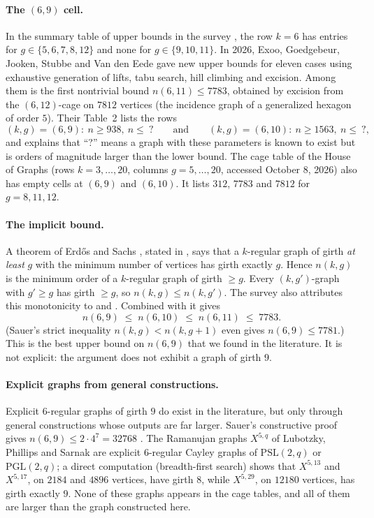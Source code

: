 \documentclass[11pt]{article}
\numberwithin{equation}{section}
\theoremstyle{definition}
\theoremstyle{remark}
\begin{document}
\paragraph{The $(6,9)$ cell.}
In the summary table of upper bounds in the survey \cite[Table~6]{ExJa}, the row $k=6$ has entries
for $g\in\{5,6,7,8,12\}$ and none for $g\in\{9,10,11\}$.
In 2026, Exoo, Goedgebeur, Jooken, Stubbe and Van den Eede \cite{EGJSV} gave new upper bounds for
eleven cases using exhaustive generation of lifts, tabu search, hill climbing and excision.
Among them is the first nontrivial bound $n(6,11)\le 7783$, obtained by excision from the
$(6,12)$-cage on $7812$ vertices (the incidence graph of a generalized hexagon of order $5$).
Their Table~2 lists the rows
\[
  (k,g)=(6,9):\ n\ge 938,\ n\le\ ?\qquad\text{and}\qquad (k,g)=(6,10):\ n\ge 1563,\ n\le\ ?,
\]
and explains that ``?'' means a graph with these parameters is known to exist but is orders of
magnitude larger than the lower bound. The cage table of the House of Graphs \cite{HoGcages}
(rows $k=3,\dots,20$, columns $g=5,\dots,20$, accessed October 8, 2026) also has empty cells
at $(6,9)$ and $(6,10)$. It lists $312$, $7783$ and $7812$ for $g=8,11,12$.

\paragraph{The implicit bound.}
A theorem of Erd\H{o}s and Sachs \cite{ES}, stated in \cite[Theorem~4]{ExJa}, says that a
$k$-regular graph of girth \emph{at least} $g$ with the minimum number of vertices has girth exactly
$g$. Hence $n(k,g)$ is the minimum order of a $k$-regular graph of girth $\ge g$. Every
$(k,g')$-graph with $g'\ge g$ has girth $\ge g$, so $n(k,g)\le n(k,g')$. The survey
\cite[p.~5]{ExJa} also attributes this monotonicity to \cite{HS} and \cite{FHR}.
Combined with \cite{EGJSV} it gives
\begin{equation}\label{eq:implicit}
  n(6,9)\;\le\; n(6,10)\;\le\; n(6,11)\;\le\; 7783 .
\end{equation}
(Sauer's strict inequality $n(k,g)<n(k,g+1)$ \cite[Theorem~9]{ExJa} even gives $n(6,9)\le 7781$.)
This is the best upper bound on $n(6,9)$ that we found in the literature. It is not explicit:
the argument does not exhibit a graph of girth $9$.

\paragraph{Explicit graphs from general constructions.}
Explicit $6$-regular graphs of girth $9$ do exist in the literature, but only through general
constructions whose outputs are far larger. Sauer's constructive proof gives
$n(6,9)\le 2\cdot 4^{7}=32768$ \cite[Theorem~7]{ExJa}. The Ramanujan graphs $X^{5,q}$ of
Lubotzky, Phillips and Sarnak \cite{LPS} are explicit $6$-regular Cayley graphs of
$\mathrm{PSL}(2,q)$ or $\mathrm{PGL}(2,q)$; a direct computation (breadth-first search) shows that
$X^{5,13}$ and $X^{5,17}$, on $2184$ and $4896$ vertices, have girth $8$, while $X^{5,29}$, on
$12180$ vertices, has girth exactly $9$. None of these graphs appears in the cage tables, and all
of them are larger than the graph constructed here.
\end{document}
